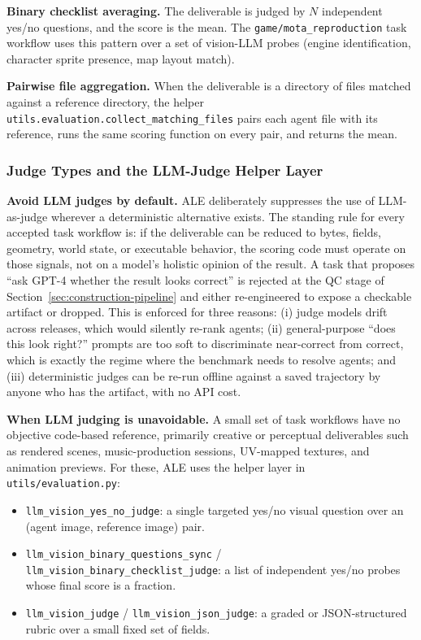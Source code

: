 \documentclass{llmxive}
\begin{document}
\noindent \textbf{Binary checklist averaging.} The deliverable is judged by $N$ independent yes/no questions, and the score is the mean. The \texttt{game/mota\_reproduction} task workflow uses this pattern over a set of vision-LLM probes (engine identification, character sprite presence, map layout match).

\noindent \textbf{Pairwise file aggregation.} When the deliverable is a directory of files matched against a reference directory, the helper \texttt{utils.evaluation.collect\_matching\_files} pairs each agent file with its reference, runs the same scoring function on every pair, and returns the mean.

\subsubsection{Judge Types and the LLM-Judge Helper Layer}
\label{app:eval-judges}

\noindent \textbf{Avoid LLM judges by default.}
ALE deliberately suppresses the use of LLM-as-judge wherever a deterministic alternative exists. The standing rule for every accepted task workflow is: if the deliverable can be reduced to bytes, fields, geometry, world state, or executable behavior, the scoring code must operate on those signals, not on a model's holistic opinion of the result. A task that proposes ``ask GPT-4 whether the result looks correct'' is rejected at the QC stage of Section~\ref{sec:construction-pipeline} and either re-engineered to expose a checkable artifact or dropped. This is enforced for three reasons: (i) judge models drift across releases, which would silently re-rank agents; (ii) general-purpose ``does this look right?'' prompts are too soft to discriminate near-correct from correct, which is exactly the regime where the benchmark needs to resolve agents; and (iii) deterministic judges can be re-run offline against a saved trajectory by anyone who has the artifact, with no API cost.

\noindent \textbf{When LLM judging is unavoidable.}
A small set of task workflows have no objective code-based reference, primarily creative or perceptual deliverables such as rendered scenes, music-production sessions, UV-mapped textures, and animation previews. For these, ALE uses the helper layer in \texttt{utils/evaluation.py}:
\begin{itemize}[nosep,leftmargin=1.2em]
    \item \texttt{llm\_vision\_yes\_no\_judge}: a single targeted yes/no visual question over an (agent image, reference image) pair.
    \item \texttt{llm\_vision\_binary\_questions\_sync} / \texttt{llm\_vision\_binary\_checklist\_judge}: a list of independent yes/no probes whose final score is a fraction.
    \item \texttt{llm\_vision\_judge} / \texttt{llm\_vision\_json\_judge}: a graded or JSON-structured rubric over a small fixed set of fields.
\end{itemize}
\end{document}
